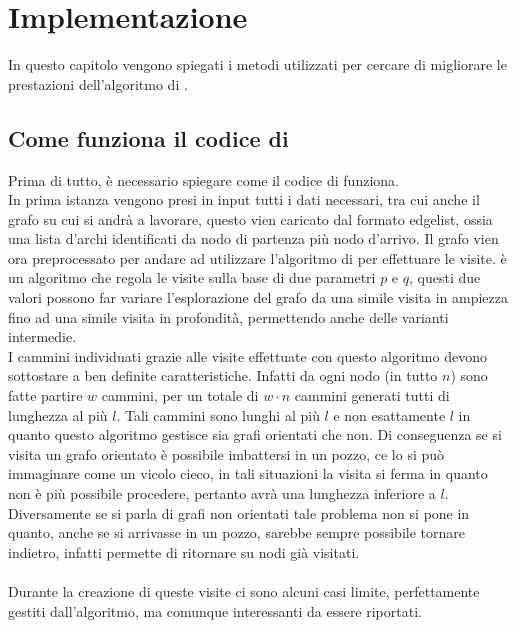 %
%
%
\chapter{Implementazione}
In questo capitolo vengono spiegati i metodi utilizzati per cercare di migliorare le prestazioni dell'algoritmo di \cnrl.
\section{Come funziona il codice di \cnrl}
Prima di tutto, è necessario spiegare come il codice di \cnrl funziona.\\
In prima istanza vengono presi in input tutti i dati necessari, tra cui anche il grafo su cui si andrà a lavorare, questo vien caricato dal formato edgelist, ossia una lista d'archi identificati da nodo di partenza più nodo d'arrivo. Il grafo vien ora preprocessato per andare ad utilizzare l'algoritmo di \nv per effettuare le visite. \nv è un algoritmo che regola le visite sulla base di due parametri $p$ e $q$, questi due valori possono far variare l'esplorazione del grafo da una simile visita in ampiezza fino ad una simile visita in profondità, permettendo anche delle varianti intermedie.\\
I cammini individuati grazie alle visite effettuate con questo algoritmo devono sottostare a ben definite caratteristiche. Infatti da ogni nodo (in tutto $n$) sono fatte partire $w$ cammini, per un totale di $w \cdot n$ cammini generati tutti di lunghezza al più $l$. Tali cammini sono lunghi al più  $l$ e non esattamente $l$ in quanto questo algoritmo gestisce sia grafi orientati che non. Di conseguenza se si visita un grafo orientato è possibile imbattersi in un pozzo, ce lo si può immaginare come un vicolo cieco, in tali situazioni la visita si ferma in quanto non è più possibile procedere, pertanto avrà una lunghezza inferiore a $l$. Diversamente se si parla di grafi non orientati tale problema non si pone in quanto, anche se si arrivasse in un pozzo, sarebbe sempre possibile tornare indietro, infatti \nv permette di ritornare su nodi già visitati.\\
\\
Durante la creazione di queste visite ci sono alcuni casi limite, perfettamente gestiti dall'algoritmo, ma comunque interessanti da essere riportati.
